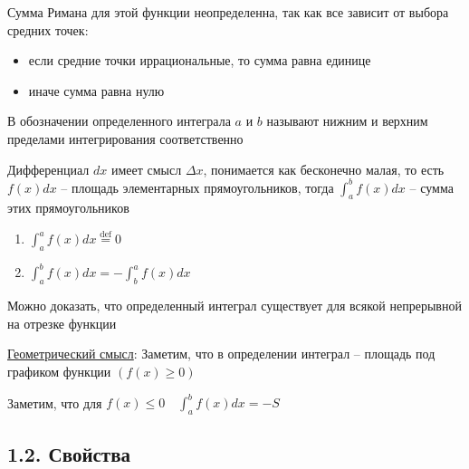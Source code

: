 \documentclass[12pt]{article}
\begin{document}
    Сумма Римана для этой функции неопределенна, так как все зависит от выбора средних точек:
    \begin{itemize}
        \item если средние точки иррациональные, то сумма равна единице
        \item иначе сумма равна нулю
    \end{itemize}

    В обозначении определенного интеграла $a$ и $b$ называют нижним и верхним пределами интегрирования соответственно

    Дифференциал $dx$ имеет смысл $\Delta x$, понимается как бесконечно малая, то есть 
    $f(x) dx$ -- площадь элементарных прямоугольников, тогда
    $\int^b_a f(x) dx$ -- сумма этих прямоугольников

    \vspace{5mm}

    \begin{enumerate}
        \item $\int_a^a f(x)dx \stackrel{\text{def}}{=} 0$
        \item $\int_a^b f(x)dx = -\int_b^a f(x)dx$
    \end{enumerate}

    Можно доказать, что определенный интеграл существует для всякой непрерывной на отрезке функции

    \underline{Геометрический смысл}: \hypertarget{integralgeommeaning}{Заметим, что в определении интеграл} -- площадь под графиком функции $(f(x) \geq 0)$

    Заметим, что для $f(x) \leq 0 \quad \int_a^b f(x)dx = -S$


    \subsection{1.2. Свойства}
    \hypertarget{integralproperties}{}
\end{document}
